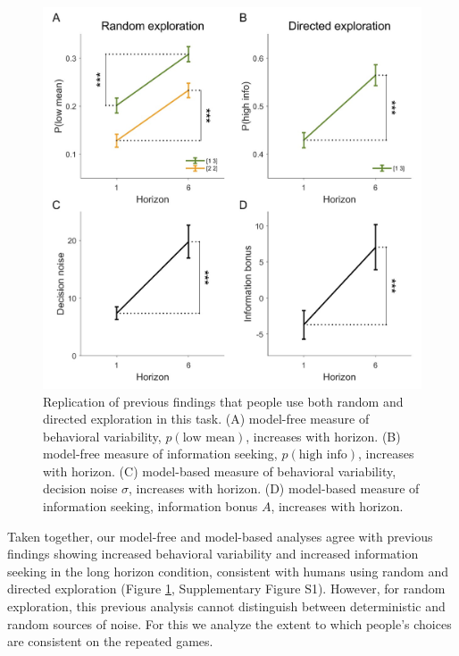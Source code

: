 \documentclass[12pt]{article}
\begin{document}
{	\begin{figure}[H]
		\begin{center}
			\includegraphics[width=\textwidth]{figures/RanDetNoise_modelfree.jpg}
			\caption{Replication of previous findings that people use both random and directed exploration in this task. (A) model-free measure of behavioral variability, $p(\mbox{low mean})$, increases with horizon. (B) model-free measure of information seeking, $p(\mbox{high info})$, increases with horizon. (C) model-based measure of behavioral variability, decision noise $\sigma$, increases with horizon. (D) model-based measure of information seeking, information bonus $A$, increases with horizon.}
			\label{fig:modelfree}
		\end{center}
	\end{figure}
	
	Taken together, our model-free and model-based analyses agree with previous findings showing increased behavioral variability and increased information seeking in the long horizon condition, consistent with humans using random and directed exploration (Figure \ref{fig:modelfree}, Supplementary Figure S1). However, for random exploration, this previous analysis cannot distinguish between deterministic and random sources of noise. For this we analyze the extent to which people's choices are consistent on the repeated games.
	
}
\end{document}
